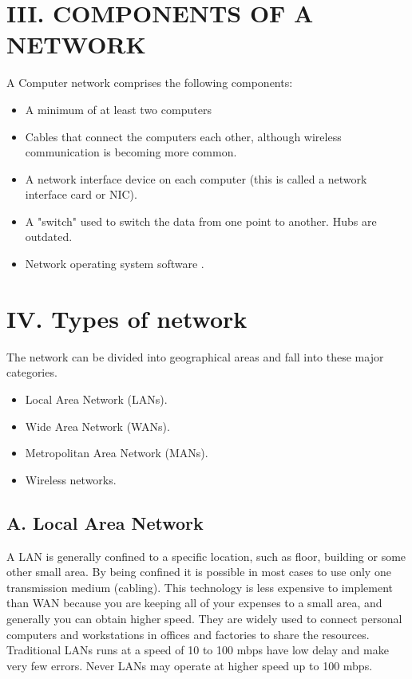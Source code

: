\documentclass[12pt]{article}
\begin{document}
\begin{multicols*}{2}
\section*{III. COMPONENTS OF A NETWORK}
A Computer network comprises the following components:
\begin{itemize}
  \item A minimum of at least two computers
  \item Cables that connect the computers each other,
although wireless communication is becoming
more common.
  \item A network interface device on each computer
(this is called a network interface card or NIC).
  \item A "switch" used to switch the data from one
point to another. Hubs are outdated.
  \item Network operating system software \cite{4}.
\end{itemize}

\section*{IV. Types of network}
The network can be divided into geographical
areas and fall into these major categories.
\begin{itemize}
  \item Local Area Network (LANs).
  \item Wide Area Network (WANs).
  \item Metropolitan Area Network (MANs).
  \item Wireless networks.
\end{itemize}

\subsection*{A. Local Area Network}
\indent \indent A LAN is generally confined to a specific
location, such as floor, building or some other small area. By being confined it is possible in most cases to
use only one transmission medium (cabling). This
technology is less expensive to implement than WAN
because you are keeping all of your expenses to a small
area, and generally you can obtain higher speed. They
are widely used to connect personal computers and
workstations in offices and factories to share the
resources. Traditional LANs runs at a speed of 10 to
100 mbps have low delay and make very few errors.
Never LANs may operate at higher speed up to 100
mbps.


\end{multicols*}
\end{document}

